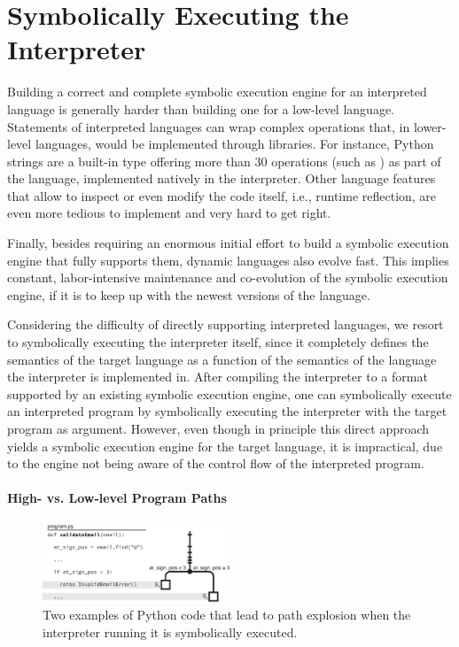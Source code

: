 
\iffalse
\section{Symbolically Executing the Interpreter}

Building a correct and complete symbolic execution engine for an interpreted language is generally harder than building one for a low-level language. 
%
Statements of interpreted languages can wrap complex operations that, in lower-level languages, would be implemented through libraries. For instance, Python strings are a built-in type offering more than 30 operations (such as ) as part of the language, implemented natively in the interpreter. 
%
Other language features that allow to inspect or even modify the code itself, i.e., runtime reflection, are even more tedious to implement and very hard to get right.

Finally, besides requiring an enormous initial effort to build a symbolic execution engine that fully supports them, dynamic languages also evolve fast. This implies constant, labor-intensive maintenance and co-evolution of the symbolic execution engine, if it is to keep up with the newest versions of the language.

Considering the difficulty of directly supporting interpreted languages, we resort to symbolically executing the interpreter itself, since it completely defines the semantics of the target language as a function of the semantics of the language the interpreter is implemented in.
%
After compiling the interpreter to a format supported by an existing symbolic execution engine, one can symbolically execute an interpreted program by symbolically executing the interpreter with the target program as argument.
%
However, even though in principle this direct approach yields a symbolic execution engine for the target language, it is impractical, due to the engine not being aware of the control flow of the interpreted program.

\paragraph{High- vs. Low-level Program Paths}

\begin{figure}
  \centering
  \includegraphics[width=2.2in]{figures/chef/running-example}
  \caption{Two examples of Python code that lead to path explosion when the interpreter running it is symbolically executed.}
  \label{fig:running-examples}
\end{figure}



